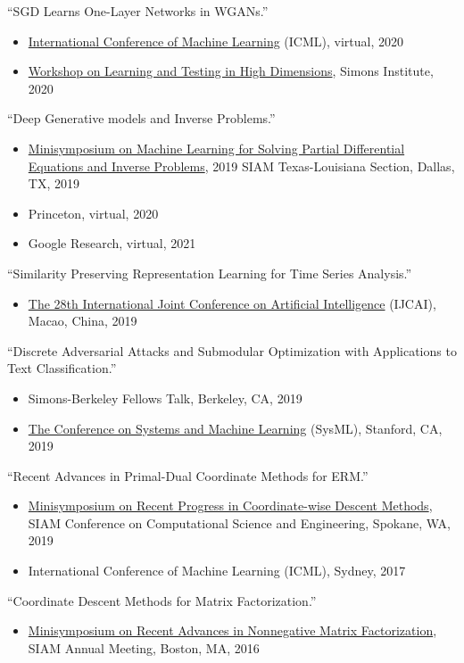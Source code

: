 \documentclass[margin, 10pt]{res} %
\begin{document}
\begin{resume}
{``SGD Learns One-Layer Networks in WGANs.''
  	\begin{itemize}[noitemsep,topsep=0pt,parsep=0pt,partopsep=0pt]
  		\item \href{https://papertalk.org/papertalks/6195}{International Conference of Machine Learning} (ICML), virtual, 2020
  		\item \href{https://simons.berkeley.edu/talks/sgd-learns-one-layer-networks-wgans}{Workshop on Learning and Testing in High Dimensions}, Simons Institute, 2020
  	\end{itemize} 
  }
{``Deep Generative models and Inverse Problems.''
	\begin{itemize}[noitemsep,topsep=0pt,parsep=0pt,partopsep=0pt]
		\item        \href{http://faculty.smu.edu/sxu/SIAMTXLA19/submissions.html}{Minisymposium on Machine Learning for Solving Partial Differential 
		Equations and Inverse Problems}, 2019 SIAM Texas-Louisiana Section, Dallas,
		TX, 2019 
		\item Princeton, virtual, 2020 
		\item  Google Research, virtual, 2021
	\end{itemize}
}


{``Similarity Preserving Representation Learning for Time Series Analysis.''
	\begin{itemize}[noitemsep,topsep=0pt,parsep=0pt,partopsep=0pt]
		\item \href{https://www.ijcai.org/proceedings/2019/394}{The 28th International Joint Conference on Artificial Intelligence} (IJCAI), Macao, China, 2019
	\end{itemize}
}
{``Discrete Adversarial Attacks 
 and Submodular Optimization with Applications to Text Classification.''
 \begin{itemize}[noitemsep,topsep=0pt,parsep=0pt,partopsep=0pt]
 	\item  Simons-Berkeley Fellows Talk, Berkeley, CA, 2019 
 	\item \href{https://www.youtube.com/watch?v=UnakqzVLVLI}{The Conference on Systems and Machine Learning}  (SysML), Stanford, CA, 
 2019
 \end{itemize} 
}
{``Recent 
     Advances in Primal-Dual Coordinate Methods for ERM.''
     \begin{itemize}[noitemsep,topsep=0pt,parsep=0pt,partopsep=0pt]
     	\item     \href{https://meetings.siam.org/sess/dsp_programsess.cfm?SESSIONCODE=66077}{Minisymposium on Recent Progress in Coordinate-wise Descent Methods}, SIAM Conference on Computational Science and Engineering, Spokane, WA, 2019
     	\item  International Conference of Machine Learning (ICML), Sydney, 2017  
     \end{itemize}
}
{``Coordinate Descent Methods for Matrix Factorization.''
 	\begin{itemize}[noitemsep,topsep=0pt,parsep=0pt,partopsep=0pt]
 		\item   \href{https://archive.siam.org/meetings/an16/}{ Minisymposium on Recent Advances in Nonnegative Matrix Factorization}, SIAM 
 		Annual Meeting, Boston, MA, 2016
 	\end{itemize}
}



\end{resume}
\end{document}
